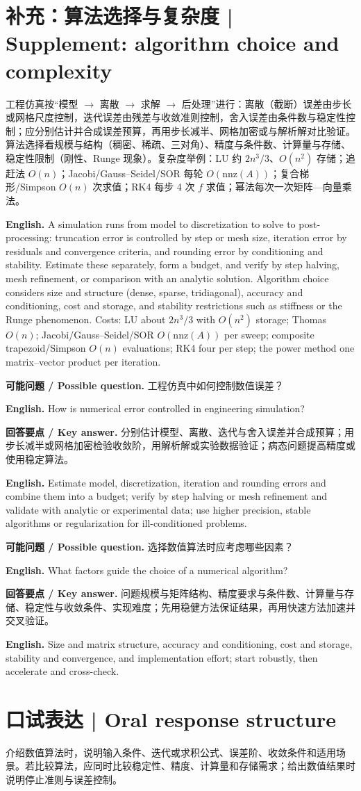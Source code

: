 \documentclass[UTF8,11pt,a4paper]{ctexart}
\newcommand{\EN}[1]{\par\noindent\textbf{English.} #1\par}
\newcommand{\ASK}[4]{\par\noindent\textbf{可能问题 / Possible question.} #1\par\EN{#2}\noindent\textbf{回答要点 / Key answer.} #3\par\EN{#4}\medskip}
\begin{document}
\section{补充：算法选择与复杂度 | Supplement: algorithm choice and complexity}
\noindent 工程仿真按“模型 $\to$ 离散 $\to$ 求解 $\to$ 后处理”进行：离散（截断）误差由步长或网格尺度控制，迭代误差由残差与收敛准则控制，舍入误差由条件数与稳定性控制；应分别估计并合成误差预算，再用步长减半、网格加密或与解析解对比验证。算法选择看规模与结构（稠密、稀疏、三对角）、精度与条件数、计算量与存储、稳定性限制（刚性、Runge 现象）。复杂度举例：LU 约 $2n^3/3$、$O(n^2)$ 存储；追赶法 $O(n)$；Jacobi/Gauss--Seidel/SOR 每轮 $O(\mathrm{nnz}(A))$；复合梯形/Simpson $O(n)$ 次求值；RK4 每步 4 次 $f$ 求值；幂法每次一次矩阵—向量乘法。
\EN{A simulation runs from model to discretization to solve to post-processing: truncation error is controlled by step or mesh size, iteration error by residuals and convergence criteria, and rounding error by conditioning and stability. Estimate these separately, form a budget, and verify by step halving, mesh refinement, or comparison with an analytic solution. Algorithm choice considers size and structure (dense, sparse, tridiagonal), accuracy and conditioning, cost and storage, and stability restrictions such as stiffness or the Runge phenomenon. Costs: LU about $2n^3/3$ with $O(n^2)$ storage; Thomas $O(n)$; Jacobi/Gauss--Seidel/SOR $O(\mathrm{nnz}(A))$ per sweep; composite trapezoid/Simpson $O(n)$ evaluations; RK4 four per step; the power method one matrix--vector product per iteration.}
\ASK{工程仿真中如何控制数值误差？}{How is numerical error controlled in engineering simulation?}{分别估计模型、离散、迭代与舍入误差并合成预算；用步长减半或网格加密检验收敛阶，用解析解或实验数据验证；病态问题提高精度或使用稳定算法。}{Estimate model, discretization, iteration and rounding errors and combine them into a budget; verify by step halving or mesh refinement and validate with analytic or experimental data; use higher precision, stable algorithms or regularization for ill-conditioned problems.}
\ASK{选择数值算法时应考虑哪些因素？}{What factors guide the choice of a numerical algorithm?}{问题规模与矩阵结构、精度要求与条件数、计算量与存储、稳定性与收敛条件、实现难度；先用稳健方法保证结果，再用快速方法加速并交叉验证。}{Size and matrix structure, accuracy and conditioning, cost and storage, stability and convergence, and implementation effort; start robustly, then accelerate and cross-check.}

\section*{口试表达 | Oral response structure}
介绍数值算法时，说明输入条件、迭代或求积公式、误差阶、收敛条件和适用场景。若比较算法，应同时比较稳定性、精度、计算量和存储需求；给出数值结果时说明停止准则与误差控制。
\end{document}
